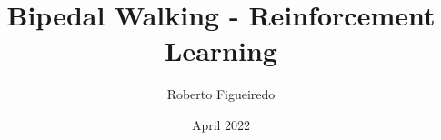 \documentclass[12pt, a4paper]{report}
\title{Bipedal Walking - Reinforcement Learning}
\author{Roberto Figueiredo}
\date{April 2022}
\begin{document}
\begin{titlepage}
    \maketitle 
    \thispagestyle{empty}
\end{titlepage}





\pagebreak
\tableofcontents
\pagebreak










    


















\end{document}
